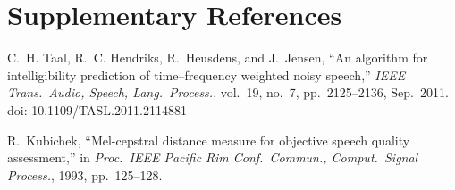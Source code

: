 \documentclass[10pt,a4paper]{article}
\begin{document}
\section*{Supplementary References}
\noindent[S1] C.~H. Taal, R.~C. Hendriks, R.~Heusdens, and J.~Jensen, ``An algorithm for intelligibility prediction of time--frequency weighted noisy speech,'' \emph{IEEE Trans.\ Audio, Speech, Lang.\ Process.}, vol.~19, no.~7, pp.~2125--2136, Sep.~2011. doi: 10.1109/TASL.2011.2114881

\noindent[S2] R.~Kubichek, ``Mel-cepstral distance measure for objective speech quality assessment,'' in \emph{Proc.\ IEEE Pacific Rim Conf.\ Commun., Comput.\ Signal Process.}, 1993, pp.~125--128.
\end{document}
